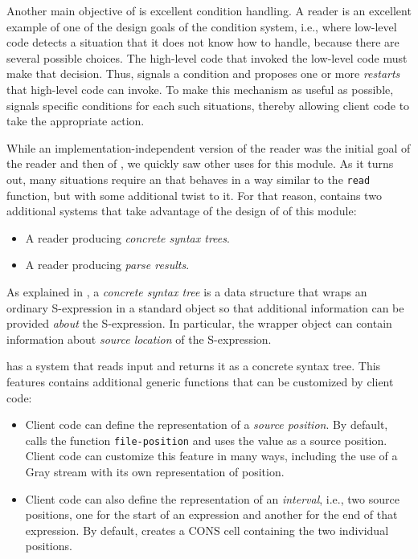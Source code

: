 Another main objective of \eclector{} is excellent condition
handling.  A \commonlisp{} reader is an excellent example of one of
the design goals of the \commonlisp{} condition system, i.e., where
low-level code detects a situation that it does not know how to
handle, because there are several possible choices.  The high-level
code that invoked the low-level code must make that decision.  Thus,
\eclector{} signals a condition and proposes one or more
\emph{restarts} that high-level code can invoke.  To make this
mechanism as useful as possible, \eclector{} signals specific
conditions for each such situations, thereby allowing client code to
take the appropriate action.

While an implementation-independent version of the \commonlisp{}
reader was the initial goal of the \sysname{} reader and then of
\eclector{}, we quickly saw other uses for this module.  As it turns
out, many situations require an that behaves in a way similar to the
\commonlisp{} \texttt{read} function, but with some additional twist
to it.  For that reason, \eclector{} contains two additional systems
that take advantage of the design of of this module:

\begin{itemize}
\item A reader producing \emph{concrete syntax trees}.
\item A reader producing \emph{parse results}.
\end{itemize}

As explained in , a \emph{concrete
  syntax tree} is a data structure that wraps an ordinary S-expression
in a standard object so that additional information can be provided
\emph{about} the S-expression.  In particular, the wrapper object can
contain information about \emph{source location} of the S-expression.

\eclector{} has a system that reads input and returns it as a concrete
syntax tree.  This features contains additional generic functions that
can be customized by client code:

\begin{itemize}
\item Client code can define the representation of a \emph{source
  position}.  By default, \eclector{} calls the function
  \texttt{file-position} and uses the value as a source position.
  Client code can customize this feature in many ways, including the
  use of a Gray stream with its own representation of position.
\item Client code can also define the representation of an
  \emph{interval}, i.e., two source positions, one for the start of an
  expression and another for the end of that expression.  By default,
  \eclector{} creates a CONS cell containing the two individual
  positions.
\end{itemize}

